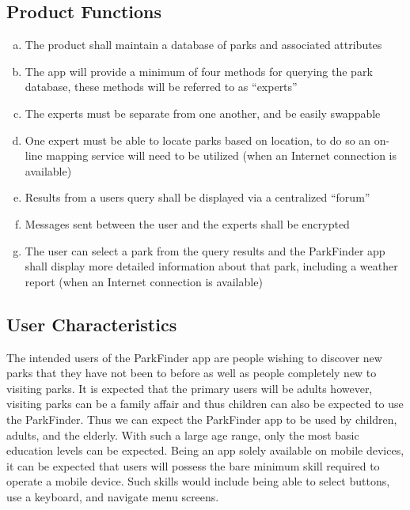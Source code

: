 \documentclass[titlepage]{article}
\begin{document}
\subsection{Product Functions}%
\label{sub:product_functions}
\begin{enumerate}[a)]
	\item The product shall maintain a database of parks and associated attributes
    \item The app will provide a minimum of four methods for querying the park database, these
    methods	will be referred to as ``experts''
    \item The experts must be separate from one another, and be easily swappable
    \item One expert must be able to locate parks based on location, to do so
    an on-line mapping service will need to be utilized (when an Internet connection is available)
    \item Results from a users query shall be displayed via a centralized ``forum''
    \item Messages sent between the user and the experts shall be encrypted
    \item The user can select a park from the query results and the ParkFinder app shall display
    more detailed information about that park, including a weather report (when an Internet
    connection is available)
\end{enumerate}

\subsection{User Characteristics}%
\label{sub:user_characteristics}
The intended users of the ParkFinder app are people wishing to discover new parks that they have not
been to before as well as people completely new to visiting parks. It is expected that the primary
users will be adults however, visiting parks can be a family affair and thus children can also
be expected to use the ParkFinder. Thus we can expect the ParkFinder app to be used by children,
adults, and the elderly. With such a large age range, only the most basic education levels can be
expected. Being an app solely available on mobile devices, it can be expected that users will
possess the bare minimum skill required to operate a mobile device. Such skills would include being
able to select buttons, use a keyboard, and navigate menu screens.
\end{document}
